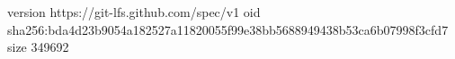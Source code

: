 version https://git-lfs.github.com/spec/v1
oid sha256:bda4d23b9054a182527a11820055f99e38bb5688949438b53ca6b07998f3cfd7
size 349692
